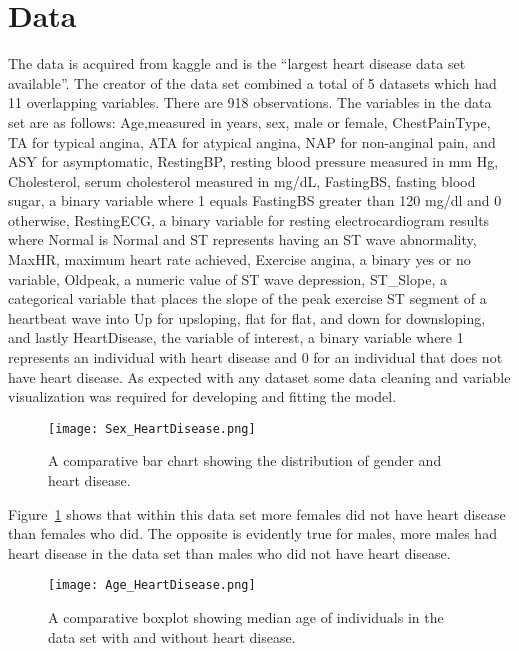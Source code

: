 \documentclass[12pt]{article}
\begin{document}


\section{Data}
\label{sec:data}

The data is acquired from kaggle and is the “largest heart disease data set available”. The creator of the data set combined a total of 5 datasets which had 11 overlapping variables. There are 918 observations. The variables in the data set are as follows: Age,measured in years, sex, male or female, ChestPainType, TA for typical angina, ATA for atypical angina, NAP for non-anginal pain, and ASY for asymptomatic, RestingBP, resting blood pressure measured in mm Hg, Cholesterol, serum cholesterol measured in mg/dL, FastingBS, fasting blood sugar, a binary variable where 1 equals FastingBS greater than 120 mg/dl and 0 otherwise, RestingECG, a binary variable for resting electrocardiogram results where Normal is Normal and ST represents having an ST wave abnormality, MaxHR, maximum heart rate achieved, Exercise angina, a binary yes or no variable, Oldpeak, a numeric value of ST wave depression, ST\_Slope, a categorical variable that places the slope of the peak exercise ST segment of a heartbeat wave into Up for upsloping, flat for flat, and down for downsloping, and lastly HeartDisease, the variable of interest, a binary variable where 1 represents an individual with heart disease and 0 for an individual that does not have heart disease. As expected with any dataset some data cleaning and variable visualization was required for developing and fitting the model. \par
\begin{figure}[tbp]
  \centering
  \texttt{[image: Sex\_HeartDisease.png]}
  \caption{A comparative bar chart showing the distribution of gender and heart disease.}
  \label{fig:heartdisease_and_sex}
\end{figure}
Figure~\ref*{fig:heartdisease_and_sex} shows that within this data set more females did not have heart disease than females who did. The opposite is evidently true for males, more males had heart disease in the data set than males who did not have heart disease. 
\begin{figure}[tbp]
  \centering
  \texttt{[image: Age\_HeartDisease.png]}
  \caption{A comparative boxplot showing median age of individuals in the data set with and without heart disease.}
  \label{fig:age_heartdisease}
\end{figure}
\end{document}
